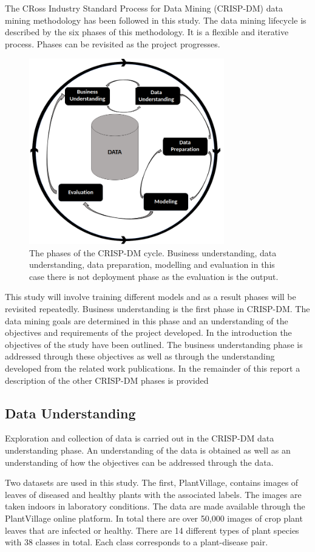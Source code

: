 \documentclass[conference]{IEEEtran}
\begin{document}
The CRoss Industry Standard Process for Data Mining (CRISP-DM) data mining methodology has been followed in this study. The data mining lifecycle is described by the six phases of this methodology. It is a flexible and iterative process. Phases can be revisited as the project progresses.
\begin{figure}[htbp]
\centerline{\includegraphics[width=8.5cm]{CRISP_DM_no deployment.png}}
\caption{    The phases of the CRISP-DM cycle. Business understanding, data understanding, data preparation, modelling and evaluation in this case there is not deployment phase as the evaluation is the output.}
\label{fig}
\end{figure}
This study will involve training different models and as a result phases will be revisited repeatedly. Business understanding is the first phase in CRISP-DM. The data mining goals are determined in this phase and an understanding of the objectives and requirements of the project developed. In the introduction the objectives of the study have been outlined. The business understanding phase is addressed through these objectives as well as through the understanding developed from the related work publications. In the remainder of this report a description of the other CRISP-DM phases is provided


\subsection{Data Understanding}\label{AA}
Exploration and collection of data is carried out in the CRISP-DM data understanding phase. An understanding of the data is obtained as well as an understanding of how the objectives can be addressed through the data. 

Two datasets are used in this study. The first, PlantVillage, contains images of leaves of diseased and healthy plants with the associated labels. The images are taken indoors in laboratory conditions. The data are made available through the PlantVillage online platform. In total there are over 50,000 images of crop plant leaves that are infected or healthy. There are 14 different types of plant species with 38 classes in total. Each class corresponds to a plant-disease pair. 
\end{document}
